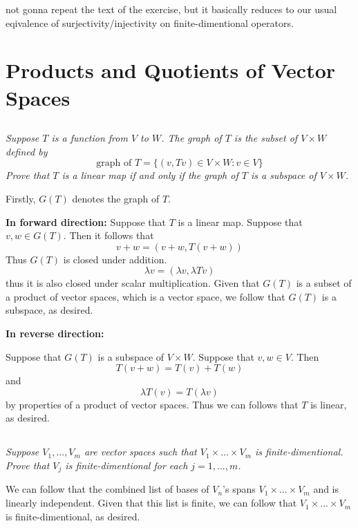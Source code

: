 \documentclass[11pt,oneside,titlepage]{book}
\begin{document}
not gonna repeat the text of the exercise, but it basically reduces to our usual eqivalence
of surjectivity/injectivity on finite-dimentional operators.

\section{Products and Quotients of Vector Spaces}

\subsection{}

\textit{Suppose $T$ is a function from $V$ to $W$. The graph of $T$ is the subset of
  $V \times W$ defined by }
$$\text{graph of } T = \{(v, Tv) \in V \times W: v \in V\}$$
\textit{Prove that $T$ is a linear map if and only if the graph of $T$  is a subspace
  of $V \times W$.}

Firstly, $G(T)$ denotes the graph of $T$. 

\textbf{In forward direction: }
Suppose that $T$ is a linear map. Suppose that $v, w \in G(T)$. Then it follows that
$$v + w = (v + w, T(v + w))$$
Thus $G(T)$ is closed under addition.
$$\lambda v = (\lambda v, \lambda Tv)$$
thus it is also closed under scalar multiplication. Given that $G(T)$ is a subset of
a product of vector spaces, which is a vector space, we follow that $G(T)$ is a subspace,
as desired.

\textbf{In reverse direction: }

Suppose that $G(T)$ is a subspace of $V \times W$. Suppose that $v, w \in V$. Then
$$T(v + w) = T(v) + T(w)$$
and
$$\lambda T(v) = T(\lambda v)$$
by properties of a product of vector spaces. Thus we can follows that $T$ is linear, as desired.

\subsection{}

\textit{Suppose $V_1, ..., V_m$ are vector spaces such that $V_1 \times ... \times V_m$ is
  finite-dimentional. Prove that $V_j$ is finite-dimentional for each $j = 1, ..., m$.}

We can follow that the combined list of bases of $V_n$'s spans $V_1 \times ... \times V_m$
and is linearly independent. Given that this list is finite, we
can follow that  $V_1 \times ... \times V_m$ is finite-dimentional, as desired.


\subsection{}
\end{document}
